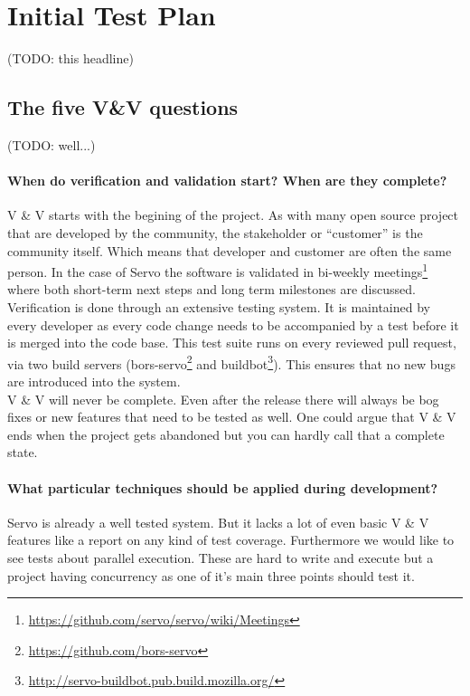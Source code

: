 \documentclass{scrartcl}
\newcommand{\todo}[1] {{\color{red}(TODO: #1)}}
\begin{document}
\newpage


\section{Initial Test Plan}

\todo{this headline}


\subsection{The five V\&V questions}
\todo{well...}

\paragraph{When do verification and validation start? When are they complete?}
V \& V starts with the begining of the project. As with many open source project that are developed by the community, the stakeholder or ``customer'' is the community itself. Which means that developer and customer are often the same person. In the case of Servo the software is validated in bi-weekly meetings\footnote{\url{https://github.com/servo/servo/wiki/Meetings}} where both short-term next steps and long term milestones are discussed.\\
  
  Verification is done through an extensive testing system. It is maintained by every developer as every code change needs to be accompanied by a test before it is merged into the code base. This test suite runs on every reviewed pull request, via two build servers (bors-servo\footnote{\url{https://github.com/bors-servo}} and buildbot\footnote{\url{http://servo-buildbot.pub.build.mozilla.org/}}). This ensures that no new bugs are introduced into the system.\\
  
V \& V will never be complete. Even after the release there will always be bog fixes or new features that need to be tested as well. One could argue that V \& V ends when the project gets abandoned but you can hardly call that a complete state.

\paragraph{What particular techniques should be applied during development?}
Servo is already a well tested system. But it lacks a lot of even basic V \& V features like a report on any kind of test coverage. Furthermore we would like to see tests about parallel execution. These are hard to write and execute but a project having concurrency as one of it's main three points should test it.
\end{document}
